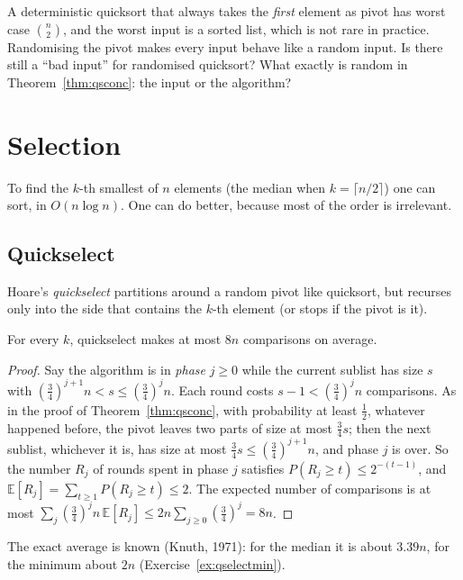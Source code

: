 \begin{think}
A deterministic quicksort that always takes the \emph{first} element as pivot has worst case $\binom n2$, and the worst input is a sorted list,
which is not rare in practice. Randomising the pivot makes every input behave like a random input. Is there still a ``bad input'' for
randomised quicksort? What exactly is random in Theorem~\ref{thm:qsconc}: the input or the algorithm?
\end{think}

\section{Selection}\label{sec:selection}

To find the $k$-th smallest of $n$ elements (the median when $k=\lceil n/2\rceil$) one can sort, in $O(n\log n)$. One can do better, because most of the
order is irrelevant.

\subsection*{Quickselect}

Hoare's \emph{quickselect} partitions around a random pivot like quicksort, but recurses only into the side that contains the $k$-th element (or
stops if the pivot is it).

\begin{proposition}\label{prop:quickselect}
For every $k$, quickselect makes at most $8n$ comparisons on average.
\end{proposition}
\begin{proof}
Say the algorithm is in \emph{phase} $j\ge0$ while the current sublist has size $s$ with $(\frac34)^{j+1}n<s\le(\frac34)^jn$. Each round costs $s-1<(\frac34)^jn$
comparisons. As in the proof of Theorem~\ref{thm:qsconc}, with probability at least $\frac12$, whatever happened before, the pivot leaves two parts of size at most
$\frac34s$; then the next sublist, whichever it is, has size at most $\frac34s\le(\frac34)^{j+1}n$, and phase $j$ is over. So the number $R_j$ of rounds spent in phase $j$
satisfies $P(R_j\ge t)\le2^{-(t-1)}$, and $\mathbb E[R_j]=\sum_{t\ge1}P(R_j\ge t)\le2$. The expected number of comparisons is at most
$\sum_j(\frac34)^jn\,\mathbb E[R_j]\le2n\sum_{j\ge0}(\frac34)^j=8n$.
\end{proof}

The exact average is known (Knuth, 1971): for the median it is about $3.39n$, for the minimum about $2n$ (Exercise~\ref{ex:qselectmin}).

